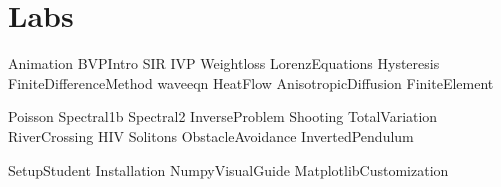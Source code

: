 \documentclass[opener-c,labs,green,nociteref]{HJnewsiambook}
\begin{document}
\part{Labs}
{Animation}
{BVPIntro}
{SIR}
{IVP} 
{Weightloss}
{LorenzEquations}
{Hysteresis}
{FiniteDifferenceMethod}
{waveeqn}
{HeatFlow}
{AnisotropicDiffusion}
{FiniteElement}

{Poisson}
{Spectral1b}
{Spectral2}
{InverseProblem}
{Shooting}
{TotalVariation}
{RiverCrossing}
{HIV}
{Solitons}
{ObstacleAvoidance}
{InvertedPendulum}

\begin{appendices}
{SetupStudent}
{Installation}
{NumpyVisualGuide}
 {MatplotlibCustomization}
\end{appendices}



\end{document}
